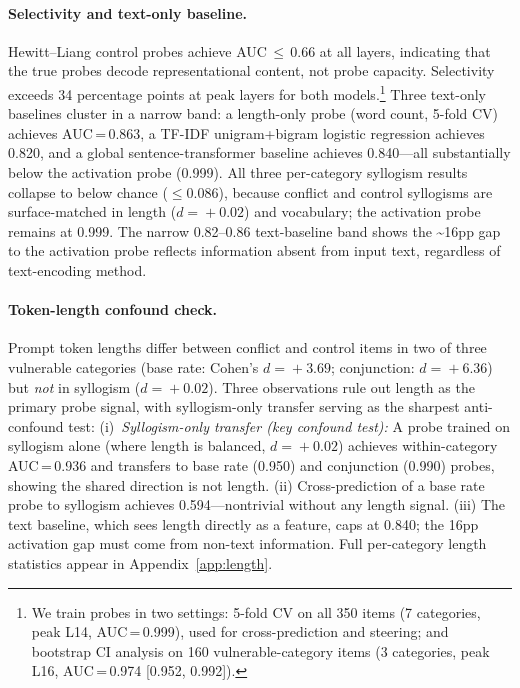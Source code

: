 \documentclass{article}
\begin{document}
\paragraph{Selectivity and text-only baseline.}  Hewitt--Liang control probes achieve
AUC\,$\leq$\,0.66 at all layers, indicating that the true probes
decode representational content, not probe capacity.  Selectivity
exceeds 34 percentage points at peak layers for both models.\footnote{We
  train probes in two settings: 5-fold CV on all 350 items (7 categories,
  peak L14, AUC\,=\,0.999), used for cross-prediction and steering; and
  bootstrap CI analysis on 160 vulnerable-category items (3 categories,
  peak L16, AUC\,=\,0.974 [0.952, 0.992]).}
Three text-only baselines cluster in a narrow band: a
length-only probe (word count, 5-fold CV) achieves AUC\,=\,0.863,
a TF-IDF unigram+bigram logistic regression achieves 0.820, and a
global sentence-transformer baseline achieves 0.840---all substantially
below the activation probe (0.999).  All three per-category syllogism
results collapse to below chance ($\leq$0.086), because
conflict and control syllogisms are surface-matched in length ($d\!=\!+0.02$)
and vocabulary; the activation probe remains at 0.999.  The
narrow 0.82--0.86 text-baseline band shows the \textasciitilde16pp
gap to the activation probe reflects information absent from input
text, regardless of text-encoding method.

\paragraph{Token-length confound check.}
Prompt token lengths differ between conflict and control items in two
of three vulnerable categories (base rate: Cohen's $d\!=\!+3.69$;
conjunction: $d\!=\!+6.36$) but \emph{not} in syllogism ($d\!=\!+0.02$).
Three observations rule out length as the primary probe signal, with syllogism-only transfer serving as the sharpest anti-confound test:
(i)~\emph{Syllogism-only transfer (key confound test):} A probe trained on syllogism alone (where length is balanced, $d\!=\!+0.02$)
achieves within-category AUC\,=\,0.936 and transfers to base rate
(0.950) and conjunction (0.990) probes, showing the shared direction
is not length.  (ii) Cross-prediction of a base rate probe to syllogism
achieves 0.594---nontrivial without any length signal.  (iii) The
text baseline, which sees length directly as a feature, caps at 0.840;
the 16pp activation gap must come from non-text information.
Full per-category length statistics appear in
Appendix~\ref{app:length}.
\end{document}
